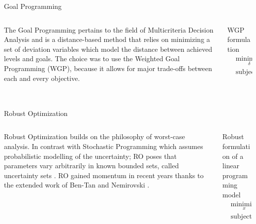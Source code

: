 \documentclass[10pt]{beamer}
\begin{document}
\begin{frame}{Goal Programming}
\begin{columns}
\begin{column}{0.5\textwidth}
The Goal Programming \cite{charnes55} pertains to the field of Multicriteria Decision Analysis and is a distance-based method that relies on minimizing a set of deviation variables which model the distance between achieved levels and goals. The choice was to use the Weighted Goal Programming (WGP), because it allows for major trade-offs between each and every objective.
\end{column}
\begin{column}{0.5\textwidth}
  \begin{alertblock}{WGP formulation}
  \begin{subequations}

\begin{align}
    & \underset{\delta}{\text{minimize}} & & w(\delta) \label{wgpmin} \\
    & \text{subject to} & & f_i(x)+ \delta_i=b_i, \; \forall i \in N \label{wgpsoftgoal} \\
    & & & x\in F \label{wgphardgoal}\\
    & & & \delta\geq 0 \label{wgppositivity}
\end{align}
\end{subequations}
\end{alertblock}
\end{column}
\end{columns}
\end{frame}

\begin{frame}{Robust Optimization}
\begin{columns}
\begin{column}{0.5\textwidth}
Robust Optimization builds on the philosophy of worst-case analysis. In contrast with Stochastic Programming \cite{dantzig55} which assumes probabilistic modelling of the uncertainty; RO poses that parameters vary arbitrarily in known bounded sets, called uncertainty sets \cite{soyster73}. RO gained momentum in recent years thanks to the extended work of Ben-Tan and Nemirovski \cite{ben-tal97}\cite{ben-tal98}\cite{ben-tal99}.
\end{column}
\begin{column}{0.5\textwidth}
  \begin{alertblock}{Robust formulation of a linear programming model}
\begin{subequations}
\begin{align}
    & \underset{x}{\text{minimize}} & & f(x) \label{rpmin} \\
    & \text{subject to} & & g(x)=\chi(\xi), \; \xi \in \Xi \label{rpcon} \\
\end{align}
\end{subequations}
  \end{alertblock}
\end{column}
\end{columns}
\end{frame}
\end{document}

